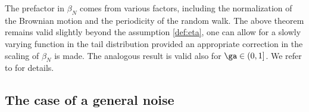 \begin{rem}
The prefactor in $\beta_N$ comes from various factors, including the normalization of the Brownian motion and the periodicity of the random walk.
The above theorem remains valid slightly beyond the assumption \eqref{def:eta}, one can allow for a slowly varying function in the tail distribution provided an appropriate correction in the scaling of $\beta_N$ is made. The analogous result is valid also for $\ga \in (0,1]$.
We refer to \cite{BL20_disc} for details.
\end{rem}

\subsection{The case of a general noise}
\label{sec:generalnoise}


